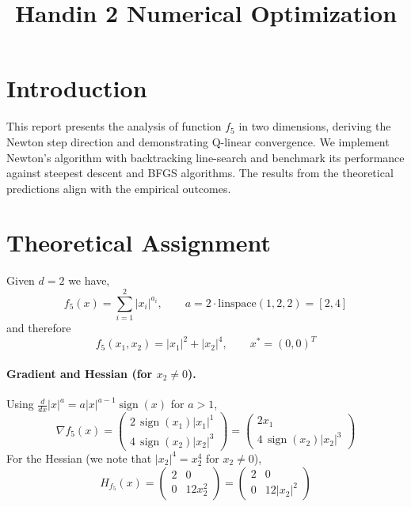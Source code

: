 \documentclass[11pt,a4paper]{article}
\title{\LARGE \textbf{Handin 2 Numerical Optimization} \\[1ex]}
\date{}
\begin{document}
\maketitle

\section{Introduction}

This report presents the analysis of function \(f_5\) in two dimensions, deriving the Newton step direction and demonstrating Q-linear convergence. We implement Newton's algorithm with backtracking line-search and benchmark its performance against steepest descent and BFGS algorithms. The results from the theoretical predictions align with the empirical outcomes.

\section{Theoretical Assignment}

Given \(d=2\) we have,
\[
f_5(x)=\sum_{i=1}^2 |x_i|^{a_i},\qquad 
a=2\cdot \mathrm{linspace}(1,2,2)=[2,4]
\]
and therefore
\[
f_5(x_1,x_2)=|x_1|^2+|x_2|^4,\qquad x^*=(0,0)^T
\]

\paragraph{Gradient and Hessian (for \(x_2\neq 0\)).}
Using \(\frac{d}{dx}|x|^a=a|x|^{a-1}\operatorname{sign}(x)\) for \(a>1\),
\[
\nabla f_5(x)=
\begin{pmatrix}
2\,\operatorname{sign}(x_1)|x_1|^{1}\\[2pt]
4\,\operatorname{sign}(x_2)|x_2|^{3}
\end{pmatrix}
=
\begin{pmatrix}
2x_1\\
4\,\operatorname{sign}(x_2)|x_2|^{3}
\end{pmatrix}
\]
For the Hessian (we note that \(|x_2|^4=x_2^4\) for \(x_2\neq 0\)),
\[
H_{f_5}(x)=
\begin{pmatrix}
2 & 0\\
0 & 12x_2^2
\end{pmatrix}
=
\begin{pmatrix}
2 & 0\\
0 & 12|x_2|^2
\end{pmatrix}
\]
\end{document}
